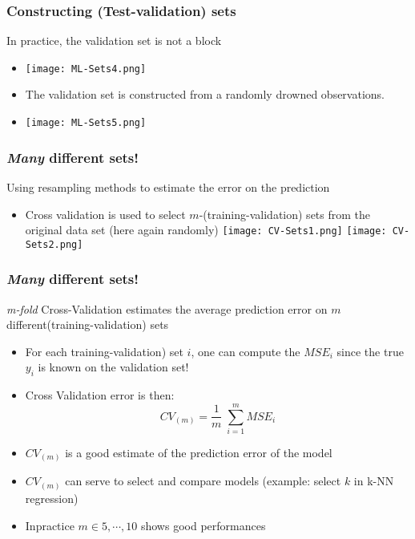 \documentclass[xcolor=x11names,compress, aspectratio=169]{beamer}
\renewcommand{\(}{\begin{columns}}
\renewcommand{\)}{\end{columns}}
\newcommand{\<}[1]{\begin{column}{#1}}
\renewcommand{\>}{\end{column}}
\begin{document}
\begin{frame}
\frametitle{\textcolor{brique}{Constructing (Test-validation) sets}}
In practice, the validation set is not a block
\begin{itemize}[<+->]
\item[] \texttt{[image: ML-Sets4.png]}
\item The validation set is constructed from a randomly drowned observations.
\item[] \texttt{[image: ML-Sets5.png]}
\end{itemize}
\end{frame}


\begin{frame}
\frametitle{\textcolor{brique}{\textit{Many} different sets!  }}
Using resampling methods to  estimate the error on the prediction
\begin{itemize}[<+->]
\item Cross validation is used to select $m$-(training-validation) sets from the original data set (here again randomly)
 {\texttt{[image: CV-Sets1.png]}}
 {\texttt{[image: CV-Sets2.png]}}
\end{itemize}
\end{frame}

\begin{frame}
\frametitle{\textcolor{brique}{\textit{Many} different sets!  }}
\textit{m-fold} Cross-Validation estimates the average prediction error on $m$ different(training-validation) sets
\begin{itemize}[<+->]
\item For each training-validation) set $i$, one can compute the $MSE_i$ since the true $y_i$ is known on the validation set! 
\item Cross Validation error is then: 
 $$ CV_{(m)}  =  \frac{1}{m} \; \sum_ {i=1}^m   MSE_i$$
 \item $CV_{(m)}$ is a good estimate of the prediction error of the model 
 \item  $CV_{(m)} $  can serve to select and compare models (example: select  $k$ in k-NN regression)
 \item Inpractice $m \in {5, \cdots, 10}$ shows good performances
\end{itemize}
\end{frame}
\end{document}
